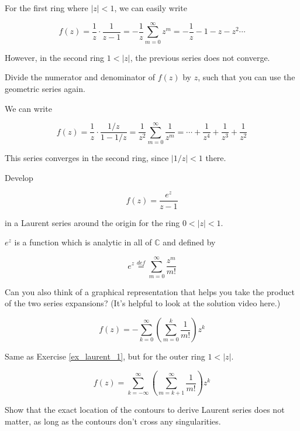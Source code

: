 For the first ring where $| z | < 1$, we can easily write

$$f(z)=\frac{1}{z} \cdot \frac{1}{z-1} = -\frac{1}{z} \sum_{m=0}^{\infty} z^m =-\frac{1}{z}-1-z-z^2 \cdots$$

However, in the second ring  $ 1 < |z|$, the previous series does not converge.

\begin{cue}
Divide the numerator and denominator of $f(z)$ by $z$, such that you can use the geometric series again.
\end{cue}

We can write

$$f(z)=\frac{1}{z} \cdot \frac{1 / z }{1-1/z} = \frac{1}{z^2} \sum_{m=0}^{\infty} \frac{1}{z^m} =\cdots+\frac{1}{z^4}+\frac{1}{z^3} + \frac{1}{z^2}$$

This series converges in the second ring, since $|1/z| < 1$ there.

\begin{exer}
\label{ex_laurent_1}
Develop

$$f(z)=\frac{e^z}{z-1}$$

in a Laurent series around the origin for the ring $0 < | z | < 1$.

$e^z$ is a function which is analytic in all of $\mathbb{C}$ and defined by

$$e^z \stackrel{def}{=} \sum_{m=0}^{\infty} \frac{z^m}{m!} $$

Can you also think of a graphical representation that helps you take the product of the two series expansions? (It's helpful to look at the solution video here.)

\begin{sol}
$$f(z)= - \sum_{k=0}^{\infty} \left(\sum _{m=0}^k \frac{1}{m!} \right) z^k $$
\end{sol}

\end{exer}

\begin{exer}
  Same as Exercise \ref{ex_laurent_1}, but for the outer ring  $1 < | z |$.

\begin{sol}
$$f(z)=  \sum_{k=-\infty}^{\infty} \left(\sum_{m=k+1}^\infty \frac{1}{m!} \right) z^k $$
\end{sol}
  
\end{exer}

\begin{exer}
  Show that the exact location of the contours to derive Laurent series does not matter, as long as the contours don't cross any singularities.

\end{exer}

